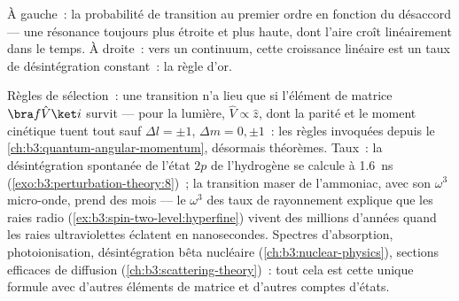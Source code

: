 \begin{omfigure}

{\small À gauche~: la probabilité de transition au premier ordre en
fonction du désaccord --- une résonance toujours plus étroite et plus
haute, dont l'aire croît linéairement dans le temps. À droite~: vers
un continuum, cette croissance linéaire est un taux de désintégration
constant~: la règle d'or.}
\end{omfigure}

\begin{example}\label{ex:b3:perturbation-theory:applications}
Règles de sélection~: une transition n'a lieu que si l'élément de
matrice $\bra f\hat V\ket i$ survit --- pour la lumière, $\hat V \propto \hat
z$, dont la parité et le moment cinétique tuent tout sauf
$\Delta l = \pm1$, $\Delta m = 0, \pm1$~: les règles invoquées depuis
le \cref{ch:b3:quantum-angular-momentum}, désormais théorèmes. Taux~:
la désintégration spontanée de l'état $2p$ de l'hydrogène se calcule à
\qty{1.6}{ns} (\cref{exo:b3:perturbation-theory:8})~; la transition
maser de l'ammoniac, avec son $\omega^3$ micro-onde, prend des mois
--- le $\omega^3$ des taux de rayonnement explique que les raies radio
(\cref{ex:b3:spin-two-level:hyperfine}) vivent des millions d'années
quand les raies ultraviolettes éclatent en nanosecondes. Spectres
d'absorption, photoionisation, désintégration bêta nucléaire
(\cref{ch:b3:nuclear-physics}), sections efficaces de diffusion
(\cref{ch:b3:scattering-theory})~: tout cela est cette unique formule
avec d'autres éléments de matrice et d'autres comptes d'états.
\end{example}

